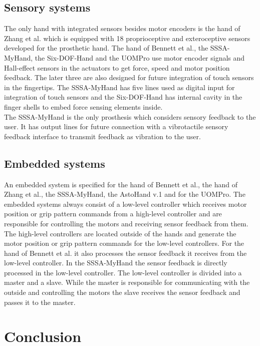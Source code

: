 \documentclass[a4paper, 10pt, conference]{ieeeconf}      %
\begin{document}
\subsection{Sensory systems}

The only hand with integrated sensors besides motor encoders is the hand of Zhang et al. which is equipped with 18 proprioceptive and exteroceptive sensors developed for the prosthetic hand. The hand of Bennett et al., the SSSA-MyHand, the Six-DOF-Hand and the UOMPro use motor encoder signals and Hall-effect sensors in the actuators to get force, speed and motor position feedback. The later three are also designed for future integration of touch sensors in the fingertips. The SSSA-MyHand has five lines used as digital input for integration of touch sensors and the Six-DOF-Hand has internal cavity in the finger shells to embed force sensing elements inside.\\
The SSSA-MyHand is the only prosthesis which considers sensory feedback to the user. It has output lines for future connection with a vibrotactile sensory feedback interface to transmit feedback as vibration to the user.

\subsection{Embedded systems}

An embedded system is specified for the hand of Bennett et al., the hand of Zhang et al., the SSSA-MyHand, the AstoHand v.1 and for the UOMPro. The embedded systems always consist of a low-level controller which receives motor position or grip pattern commands from a high-level controller and are responsible for controlling the motors and receiving sensor feedback from them. The high-level controllers are located outside of the hands and generate the motor position or grip pattern commands for the low-level controllers. For the hand of Bennett et al. it also processes the sensor feedback it receives from the low-level controller. In the SSSA-MyHand the sensor feedback is directly processed in the low-level controller. The low-level controller is divided into a master and a slave. While the master is responsible for communicating with the outside and controlling the motors the slave receives the sensor feedback and passes it to the master.


\section{Conclusion}
\end{document}
